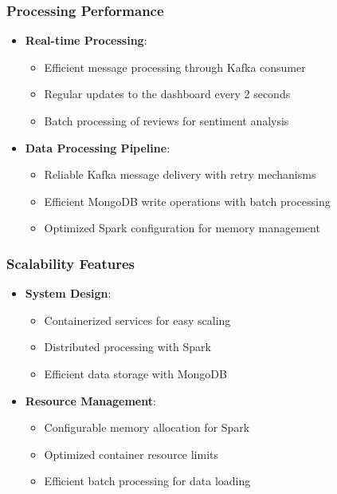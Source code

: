 \documentclass[11pt,a4paper,twocolumn]{article}
\begin{document}
\subsubsection{Processing Performance}
\begin{itemize}
    \item \textbf{Real-time Processing}:
    \begin{itemize}
        \item Efficient message processing through Kafka consumer
        \item Regular updates to the dashboard every 2 seconds
        \item Batch processing of reviews for sentiment analysis
    \end{itemize}
    
    \item \textbf{Data Processing Pipeline}:
    \begin{itemize}
        \item Reliable Kafka message delivery with retry mechanisms
        \item Efficient MongoDB write operations with batch processing
        \item Optimized Spark configuration for memory management
    \end{itemize}
\end{itemize}

\subsubsection{Scalability Features}
\begin{itemize}
    \item \textbf{System Design}:
    \begin{itemize}
        \item Containerized services for easy scaling
        \item Distributed processing with Spark
        \item Efficient data storage with MongoDB
    \end{itemize}
    
    \item \textbf{Resource Management}:
    \begin{itemize}
        \item Configurable memory allocation for Spark
        \item Optimized container resource limits
        \item Efficient batch processing for data loading
    \end{itemize}
\end{itemize}
\end{document}
